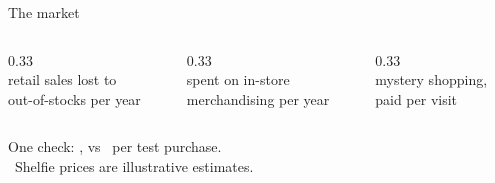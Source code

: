 \begin{frame}{The market}
  \centering
  \begin{columns}[T]
    \begin{column}{0.33\textwidth}\centering
      {\fontsize{28}{32}\selectfont\bfseries\color{cardano}\MarketPain}\\ retail sales lost to\\ out-of-stocks per year
    \end{column}
    \begin{column}{0.33\textwidth}\centering
      {\fontsize{28}{32}\selectfont\bfseries\color{cardano}\MarketServices}\\ spent on in-store\\ merchandising per year
    \end{column}
    \begin{column}{0.33\textwidth}\centering
      {\fontsize{28}{32}\selectfont\bfseries\color{cardano}\MarketMystery}\\ mystery shopping,\\ paid per visit
    \end{column}
  \end{columns}
  \vspace{1.2em}
  {\Large One check: \alert{\PricePerStore}, vs \CostPerVisit\ per test purchase.}\\[0.5em]
  {\scriptsize \MarketSources\ Shelfie prices are illustrative estimates.}
\end{frame}
